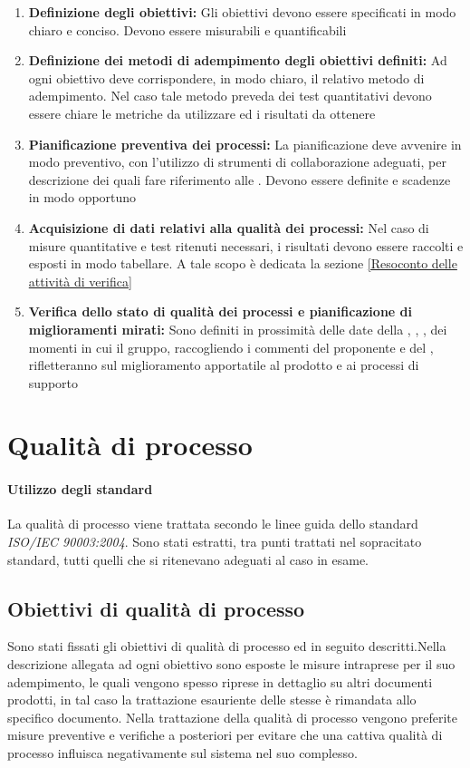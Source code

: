 \documentclass[12pt,a4paper]{article}
\begin{document}
\begin{enumerate}
	\item \textbf {Definizione degli obiettivi:} Gli obiettivi devono essere specificati in modo chiaro e conciso. Devono essere misurabili e quantificabili
	\item \textbf{Definizione dei metodi di adempimento degli obiettivi definiti:} Ad ogni obiettivo deve corrispondere, in modo chiaro, il relativo metodo di adempimento. Nel caso tale metodo preveda dei test quantitativi devono essere chiare le metriche da utilizzare ed i risultati da ottenere
	\item \textbf{Pianificazione preventiva dei processi:} La pianificazione deve avvenire in modo preventivo, con l'utilizzo di strumenti di collaborazione adeguati, per descrizione dei quali fare riferimento alle \NdP{}. Devono essere definite  e scadenze in modo opportuno
	\item \textbf{Acquisizione di dati relativi alla qualità dei processi:} Nel caso di misure quantitative e test ritenuti necessari, i risultati devono essere raccolti e esposti in modo tabellare. A tale scopo è dedicata la sezione \ref{Resoconto delle attività di verifica}
	\item \textbf{Verifica dello stato di qualità dei processi e pianificazione di miglioramenti mirati:}
	Sono definiti in prossimità delle date della \RR{}, \RA{}, \RP{}, \RQ{} dei momenti in cui il gruppo, raccogliendo i commenti del proponente \Zucchetti{} e del \Vardanega{}, rifletteranno sul miglioramento apportatile al prodotto e ai processi di supporto
\end{enumerate}

\newpage

\section{Qualità di processo}
\paragraph{Utilizzo degli standard}
La qualità di processo viene trattata secondo le linee guida dello standard \textit{ISO/IEC 90003:2004}. Sono stati estratti, tra punti trattati nel sopracitato standard, tutti quelli che si ritenevano adeguati al caso in esame.
\subsection{Obiettivi di qualità di processo}
Sono stati fissati gli obiettivi di qualità di processo ed in seguito descritti.Nella descrizione allegata ad ogni obiettivo sono esposte le misure intraprese per il suo adempimento, le quali vengono spesso riprese in dettaglio su altri documenti prodotti, in tal caso la trattazione esauriente delle stesse è rimandata allo specifico documento. 
Nella trattazione della qualità di processo vengono preferite misure preventive e verifiche a posteriori per evitare che una cattiva qualità di processo influisca negativamente sul sistema nel suo complesso.
\end{document}
